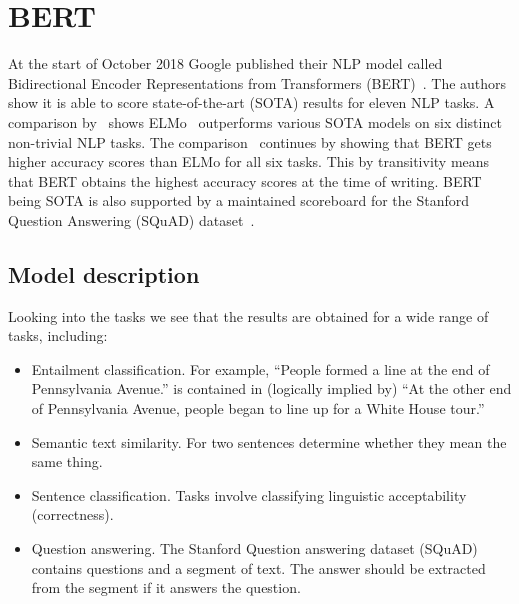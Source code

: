 \section{BERT}
\label{sec:bert}
At the start of October 2018 Google published their NLP model called Bidirectional Encoder Representations from Transformers (BERT)~\citep{devlin2018}.
The authors show it is able to score state-of-the-art (SOTA) results for eleven NLP tasks.
A comparison by~\citet{young2018recent} shows ELMo~\citep{peters2018} outperforms various SOTA models on six distinct non-trivial NLP tasks.
The comparison~\citep{young2018recent} continues by showing that BERT gets higher accuracy scores than ELMo for all six tasks.
This by transitivity means that BERT obtains the highest accuracy scores at the time of writing.
BERT being SOTA is also supported by a maintained scoreboard for the Stanford Question Answering (SQuAD) dataset~\citep{rajpurkar2019explorer}.

\subsection{Model description}
\label{subsec:model_description}
Looking into the tasks we see that the results are obtained for a wide range of tasks, including:
\begin{itemize}
    \item Entailment classification.
    For example, ``People formed a line at the end of Pennsylvania Avenue.''
    is contained in (logically implied by) ``At the other end of Pennsylvania Avenue, people began to line up for a White House tour.''~\cite{williams2018}
    \item Semantic text similarity.
    For two sentences determine whether they mean the same thing.
    \item Sentence classification.
    Tasks involve classifying linguistic acceptability (correctness).
    \item Question answering.
    The Stanford Question answering dataset (SQuAD)~\cite{rajpurkar2018} contains questions and a segment of text.
    The answer should be extracted from the segment if it answers the question.
\end{itemize}

